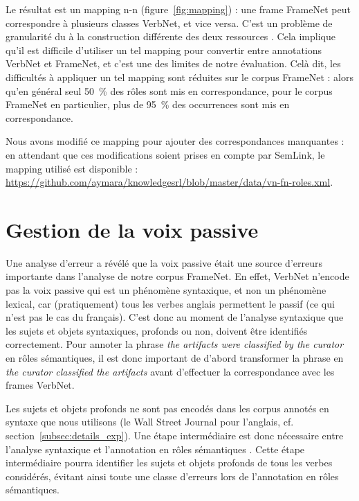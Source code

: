 Le résultat est un mapping n-n (figure~\ref{fig:mapping}) : une frame FrameNet
peut correspondre à plusieurs classes VerbNet, et vice versa. C'est un problème
de granularité du à la construction différente des deux ressources
\citep{palmer2009semlink}. Cela implique qu'il est difficile d'utiliser un tel
mapping pour convertir entre annotations VerbNet et FrameNet, et c'est une des
limites de notre évaluation.  Celà dit, les difficultés à appliquer un tel
mapping sont réduites sur le corpus FrameNet : alors qu'en général seul 50~\%
des rôles sont mis en correspondance, pour le corpus FrameNet en particulier,
plus de 95~\% des occurrences sont mis en correspondance.

Nous avons modifié ce mapping pour ajouter des correspondances manquantes : en
attendant que ces modifications soient prises en compte par SemLink, le mapping
utilisé est disponible :
\url{https://github.com/aymara/knowledgesrl/blob/master/data/vn-fn-roles.xml}.

\section{Gestion de la voix passive}
\label{sec:passif}

Une analyse d'erreur a révélé que la voix passive était une source d'erreurs
importante dans l'analyse de notre corpus FrameNet. En effet, VerbNet n'encode
pas la voix passive qui est un phénomène syntaxique, et non un phénomène
lexical, car (pratiquement) tous les verbes anglais permettent le passif (ce
qui n'est pas le cas du français). C'est donc au moment de l'analyse syntaxique
que les sujets et objets syntaxiques, profonds ou non, doivent être identifiés
correctement. Pour annoter la phrase \emph{the artifacts were classified by the
curator} en rôles sémantiques, il est donc important de d'abord transformer la
phrase en \emph{the curator classified the artifacts} avant d'effectuer la
correspondance avec les frames VerbNet.

Les sujets et objets profonds ne sont pas encodés dans les corpus annotés en
syntaxe que nous utilisons (le Wall Street Journal pour l'anglais, cf.
section~\ref{subsec:details_exp}). Une étape intermédiaire est donc nécessaire
entre l'analyse syntaxique et l'annotation en rôles sémantiques
\citep{bonfante2011modular, ribeyre2013systeme}. Cette étape intermédiaire
pourra identifier les sujets et objets profonds de tous les verbes considérés,
évitant ainsi toute une classe d'erreurs lors de l'annotation en rôles
sémantiques. 

